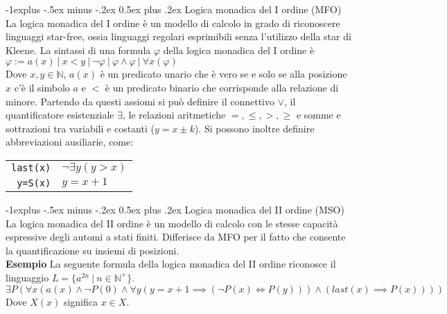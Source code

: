 \documentclass[10pt,landscape]{article}
\makeatletter
\renewcommand{\subsection}{\@startsection{subsection}{2}{0mm}%
                                {-1explus -.5ex minus -.2ex}%
                                {0.5ex plus .2ex}%
                                {\normalfont\large\bfseries}}
\makeatother
\begin{document}
\begin{multicols*}{4}
        \subsection{Logica monadica del I ordine (MFO)}
        La logica monadica del I ordine è un modello di calcolo in grado di riconoscere linguaggi star-free, ossia linguaggi regolari esprimibili senza l'utilizzo della star di Kleene. La sintassi di una formula $\varphi$ della logica monadica del I ordine è  $\varphi := a(x) \ | \ x < y \ | \ \lnot \varphi \ | \ \varphi \land \varphi \ | \ \forall x (\varphi)$ \\
        Dove $x,y \in \mathbb{N}$, $a(x)$ è un predicato unario che è vero se e solo se alla posizione $x$ c'è il simbolo $a$ e $<$ è un predicato binario che corrisponde alla relazione di minore. Partendo da questi assiomi si può definire il connettivo $\lor$, il quantificatore esistenziale $\exists$, le relazioni aritmetiche $=, \leq, >, \geq$ e somme e sottrazioni tra variabili e costanti ($y=x \pm k$). Si possono inoltre definire abbreviazioni ausiliarie, come:\\
        \begin{tabular}{r l}
                \verb|last(x)| & $\lnot \exists y (y>x)$ \\
                \verb|y=S(x)|  & $y=x+1$                 \\
        \end{tabular}
        \subsection{Logica monadica del II ordine (MSO)}
        La logica monadica del II ordine è un modello di calcolo con le stesse capacità espressive degli automi a stati finiti. Differisce da MFO per il fatto che consente la quantificazione su insiemi di posizioni. \\
        \textbf{Esempio} La seguente formula della logica monadica del II ordine riconosce il linguaggio $L = \{a^{2n}\ |\ n \in \mathbb{N}^+\}$.\\ [5pt]
        $\exists P (\forall x(a(x) \land \lnot P(0) \land \forall y(y=x+1 \implies (\lnot P(x) \iff P(y))) \land (last(x) \implies P(x))))$ \\ [5pt]
        Dove $X(x)$ significa $x \in X$.

\end{multicols*}
\end{document}
